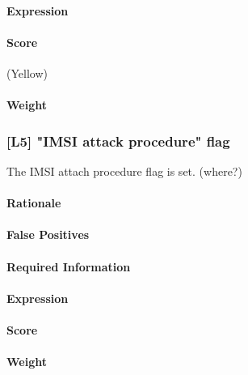 \documentclass[a4paper,11pt,notitlepage,bigheadings,oneside]{scrartcl}
\begin{document}
\TBD{}

\paragraph{Expression}

\TBD{}

\paragraph{Score}

\TBD{} (Yellow)

\paragraph{Weight}

\TBD{}

\subsubsection{[L5] "IMSI attack procedure" flag}

The IMSI attach procedure flag is set. (where?)

\paragraph{Rationale}

\TBD{}

\paragraph{False Positives}

\TBD{}

\paragraph{Required Information}

\TBD{}

\paragraph{Expression}

\TBD{}

\paragraph{Score}

\TBD{}

\paragraph{Weight}
\end{document}
